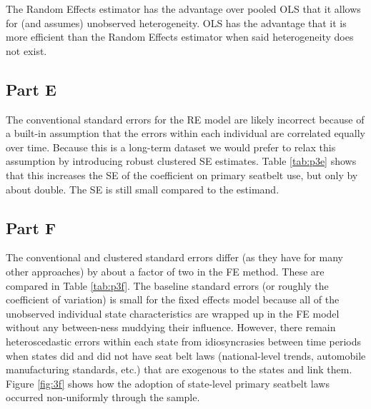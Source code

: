 \documentclass[letterpaper, 12pt]{article}
\begin{document}
The Random Effects estimator has the advantage over pooled OLS that it allows for (and assumes) unobserved heterogeneity. OLS has the advantage that it is more efficient than the Random Effects estimator when said heterogeneity does not exist.

\subsection{Part E}

The conventional standard errors for the RE model are likely incorrect because of a built-in assumption that the errors within each individual are correlated equally over time.  Because this is a long-term dataset we would prefer to relax this assumption by introducing robust clustered SE estimates.  Table \ref{tab:p3e} shows that this increases the SE of the coefficient on primary seatbelt use, but only by about double.  The SE is still small compared to the estimand.



\subsection{Part F}

The conventional and clustered standard errors differ (as they have for many other approaches) by about a factor of two in the FE method.  These are compared in Table \ref{tab:p3f}.  The baseline standard errors (or roughly the coefficient of variation) is small for the fixed effects model because all of the unobserved individual state characteristics are wrapped up in the FE model without any between-ness muddying their influence.  However, there remain heteroscedastic errors within each state from idiosyncrasies  between time periods when states did and did not have seat belt laws (national-level trends, automobile manufacturing standards, etc.) that are exogenous to the states and link them.  Figure \ref{fig:3f} shows how the adoption of state-level primary seatbelt laws occurred non-uniformly through the sample.


\end{document}
